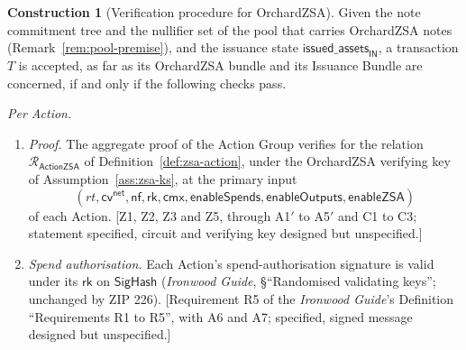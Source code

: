 \documentclass[11pt,a4paper]{article}
\theoremstyle{definition}
\newtheorem{construction}[theorem]{Construction}
\newcommand{\Rel}{\mathcal{R}}
\newcommand{\nfsym}{\mathsf{nf}}
\newcommand{\cmx}{\mathsf{cmx}}
\newcommand{\cvsym}{\mathsf{cv}}
\newcommand{\rk}{\mathsf{rk}}
\begin{document}
\begin{construction}[Verification procedure for OrchardZSA]
\label{def:zsa-verify}
Given the note commitment tree and the nullifier set of the pool that carries
OrchardZSA notes (Remark~\ref{rem:pool-premise}), and the issuance state
$\mathsf{issued\_assets}_{\mathsf{IN}}$, a transaction $T$ is accepted, as
far as its OrchardZSA bundle and its Issuance Bundle are concerned, if and
only if the following checks pass.

\emph{Per Action.}
\begin{enumerate}[label=(\arabic*), leftmargin=2.4em]
\item \emph{Proof.} The aggregate proof of the Action Group verifies for the
  relation $\Rel_{\mathsf{ActionZSA}}$ of Definition~\ref{def:zsa-action},
  under the OrchardZSA verifying key of Assumption~\ref{ass:zsa-ks}, at the
  primary input
  \[
    (\mathit{rt}, \cvsym^{\mathsf{net}}, \nfsym, \rk, \cmx,
    \mathsf{enableSpends}, \mathsf{enableOutputs}, \mathsf{enableZSA})
  \]
  of each Action. [Z1, Z2, Z3 and Z5, through A1$'$ to A5$'$ and C1 to C3;
  statement specified, circuit and verifying key designed but unspecified.]
\item \emph{Spend authorisation.} Each Action's spend-authorisation signature
  is valid under its $\rk$ on $\mathsf{SigHash}$ (\emph{Ironwood Guide},
  \S``Randomised validating keys''; unchanged by ZIP 226). [Requirement R5
  of the \emph{Ironwood Guide}'s Definition ``Requirements R1 to R5'', with
  A6 and A7; specified, signed message designed but unspecified.]
\end{enumerate}


\end{construction}
\end{document}
